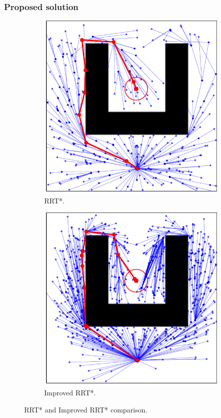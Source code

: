 \documentclass{beamer}
\begin{document}
\begin{frame}
	\frametitle{Proposed solution}	
	\begin{figure}[!ht]
		\centering 
		\begin{subfigure}[b]{0.45\textwidth}
			\includegraphics[width=\textwidth]{figChap4/RRTstar_maze216.0.pdf}
			\caption{RRT*.}
			\label{fig:rrtstar_maze}
		\end{subfigure}  
		\begin{subfigure}[b]{0.45\textwidth}
			\includegraphics[width=\textwidth]{figChap4/RRTstarML_maze206.0.pdf}
			\caption{Improved RRT*.}
			\label{fig:rrtstarML_maze}
		\end{subfigure}
		\caption{RRT* and Improved RRT* comparison.}
		\label{fig:RRTstar_vs_RRTstarML}
	  \end{figure}
\end{frame}	
\end{document}
